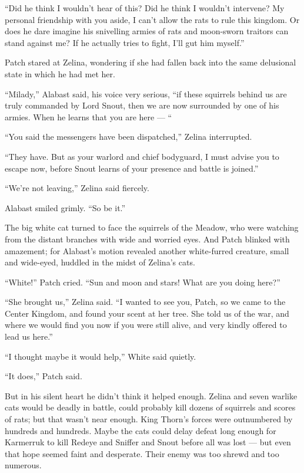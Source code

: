 \documentclass[12pt]{memoir}
\begin{document}
“Did he think I wouldn’t hear of this? Did he think I wouldn’t
intervene? My personal friendship with you aside, I can’t allow the
rats to rule this kingdom. Or does he dare imagine his snivelling
armies of rats and moon-sworn traitors can stand against me? If he
actually tries to fight, I’ll gut him myself.”

Patch stared at Zelina, wondering if she had fallen back into the same
delusional state in which he had met her.

“Milady,” Alabast said, his voice very serious, “if these squirrels
behind us are truly commanded by Lord Snout, then we are now
surrounded by one of his armies. When he learns that you are here — “

“You said the messengers have been dispatched,” Zelina interrupted.

“They have. But as your warlord and chief bodyguard, I must advise you
to escape now, before Snout learns of your presence and battle is
joined.”

“We’re not leaving,” Zelina said fiercely.

Alabast smiled grimly. “So be it.”

The big white cat turned to face the squirrels of the Meadow, who were
watching from the distant branches with wide and worried eyes. And
Patch blinked with amazement; for Alabast’s motion revealed another
white-furred creature, small and wide-eyed, huddled in the midst of
Zelina’s cats.

“White!” Patch cried. “Sun and moon and stars! What are you doing
here?”

“She brought us,” Zelina said. “I wanted to see you, Patch, so we came
to the Center Kingdom, and found your scent at her tree. She told us
of the war, and where we would find you now if you were still alive,
and very kindly offered to lead us here.”

“I thought maybe it would help,” White said quietly.

“It does,” Patch said.

But in his silent heart he didn’t think it helped enough. Zelina and
seven warlike cats would be deadly in battle, could probably kill
dozens of squirrels and scores of rats; but that wasn’t near
enough. King Thorn’s forces were outnumbered by hundreds and
hundreds. Maybe the cats could delay defeat long enough for Karmerruk
to kill Redeye and Sniffer and Snout before all was lost — but even
that hope seemed faint and desperate. Their enemy was too shrewd and
too numerous.
\end{document}
